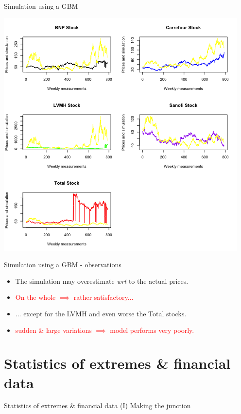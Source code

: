 \documentclass{beamer}
\begin{document}
\begin{frame}{Simulation using a GBM }
	\begin{center}
		\includegraphics[scale = 0.45]{dataPlusSimulation.png}
	\end{center}
\end{frame}

\begin{frame}{Simulation using a GBM - observations}
	\begin{itemize}
		\item The simulation may overestimate \textit{wrt} to the actual prices. \\
		\item \textcolor{red}{On the whole $\implies$ rather satisfactory...} \\
		\item ... except for the LVMH and even worse the Total stocks. \\
		\item \textcolor{red}{sudden \& large variations $\implies$ model performs very poorly.}
	\end{itemize}
\end{frame}

\section{Statistics of extremes \& financial data}
\begin{frame}{Statistics of extremes \& financial data (I)}
	Making the junction
\end{frame}
\end{document}
